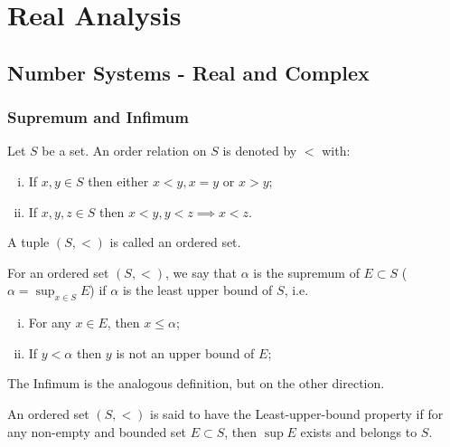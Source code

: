 \chapter{Real Analysis}

\section{Number Systems - Real and Complex}

\subsection{Supremum and Infimum}

\begin{definition}
	Let $S$ be a set. An order relation on $S$ is denoted by $<$ with:
	\begin{enumerate}[(i)]
		\item If $x,y  \in S$ then either $x<y, x=y$ or $x>y$;
		\item If $x,y, z \in S$ then $x < y, y < z \implies x < z$.
	\end{enumerate}
	A tuple $(S, <)$ is called an ordered set.
\end{definition}

\begin{definition}
	For an ordered set $(S,<)$, we say that $\alpha$ is the supremum of $E \subset S$
	($\alpha = \sup_{x \in S} E$) if $\alpha$
	is the least upper bound of $S$, i.e.
	\begin{enumerate}[(i)]
		\item For any $x \in E$, then $x \leq \alpha$;
		\item If $y < \alpha$ then $y$ is not an upper bound of $E$;
	\end{enumerate}
	The Infimum is the analogous definition, but on the other direction.
\end{definition}

\begin{definition}
	An ordered set $(S,<)$ is said to have the Least-upper-bound property if
	for any non-empty and bounded set $E \subset S$, then $\sup E$ exists
	and belongs to $S$.
\end{definition}

